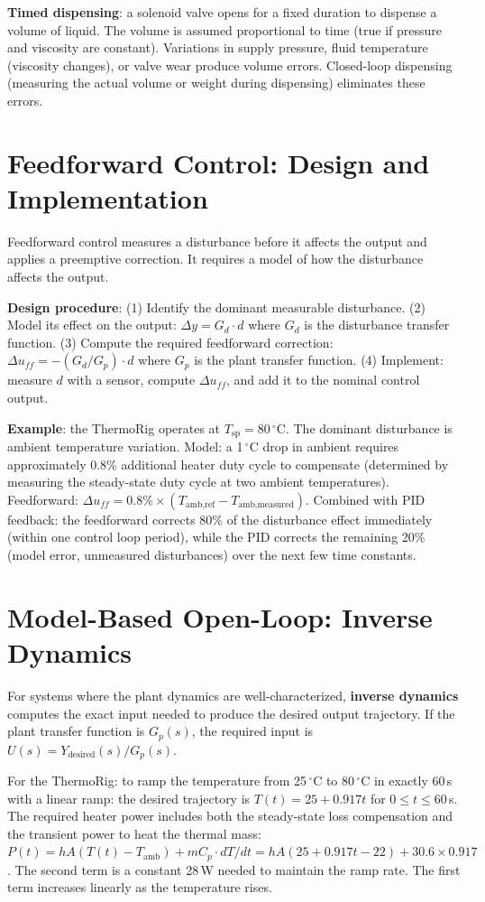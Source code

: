 \documentclass[11pt,letterpaper,twoside,openany]{book}
\newcommand{\degC}{\ensuremath{{}^{\circ}\text{C}}}
\begin{document}
\textbf{Timed dispensing}: a solenoid valve opens for a fixed duration to dispense a volume of liquid. The volume is assumed proportional to time (true if pressure and viscosity are constant). Variations in supply pressure, fluid temperature (viscosity changes), or valve wear produce volume errors. Closed-loop dispensing (measuring the actual volume or weight during dispensing) eliminates these errors.

\section{Feedforward Control: Design and Implementation}
Feedforward control measures a disturbance before it affects the output and applies a preemptive correction. It requires a model of how the disturbance affects the output.

\textbf{Design procedure}: (1) Identify the dominant measurable disturbance. (2) Model its effect on the output: $\Delta y = G_d \cdot d$ where $G_d$ is the disturbance transfer function. (3) Compute the required feedforward correction: $\Delta u_{ff} = -(G_d/G_p) \cdot d$ where $G_p$ is the plant transfer function. (4) Implement: measure $d$ with a sensor, compute $\Delta u_{ff}$, and add it to the nominal control output.

\textbf{Example}: the ThermoRig operates at $T_{\text{sp}} = 80$\,\degC{}. The dominant disturbance is ambient temperature variation. Model: a 1\,\degC{} drop in ambient requires approximately 0.8\% additional heater duty cycle to compensate (determined by measuring the steady-state duty cycle at two ambient temperatures). Feedforward: $\Delta u_{ff} = 0.8\% \times (T_{\text{amb,ref}} - T_{\text{amb,measured}})$. Combined with PID feedback: the feedforward corrects 80\% of the disturbance effect immediately (within one control loop period), while the PID corrects the remaining 20\% (model error, unmeasured disturbances) over the next few time constants.

\section{Model-Based Open-Loop: Inverse Dynamics}
For systems where the plant dynamics are well-characterized, \textbf{inverse dynamics} computes the exact input needed to produce the desired output trajectory. If the plant transfer function is $G_p(s)$, the required input is $U(s) = Y_{\text{desired}}(s) / G_p(s)$.

For the ThermoRig: to ramp the temperature from 25\,\degC{} to 80\,\degC{} in exactly 60\,s with a linear ramp: the desired trajectory is $T(t) = 25 + 0.917t$ for $0 \leq t \leq 60$\,s. The required heater power includes both the steady-state loss compensation and the transient power to heat the thermal mass: $P(t) = hA(T(t) - T_{\text{amb}}) + mC_p \cdot dT/dt = hA(25 + 0.917t - 22) + 30.6 \times 0.917$. The second term is a constant 28\,W needed to maintain the ramp rate. The first term increases linearly as the temperature rises.
\end{document}
